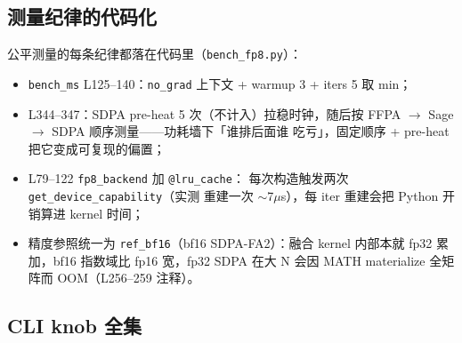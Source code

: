 \subsection{测量纪律的代码化}

公平测量的每条纪律都落在代码里（\texttt{bench\_fp8.py}）：
\begin{itemize}[itemsep=0pt,topsep=2pt]
  \item \texttt{bench\_ms} L125--140：\texttt{no\_grad} 上下文 +
        warmup 3 + iters 5 取 min；
  \item L344--347：SDPA pre-heat 5 次（不计入）拉稳时钟，随后按
        FFPA $\to$ Sage $\to$ SDPA 顺序测量——功耗墙下「谁排后面谁
        吃亏」，固定顺序 + pre-heat 把它变成可复现的偏置；
  \item L79--122 \texttt{fp8\_backend} 加 \texttt{@lru\_cache}：
        每次构造触发两次 \texttt{get\_device\_capability}（实测
        重建一次 $\sim$7$\mu$s），每 iter 重建会把 Python 开销算进
        kernel 时间；
  \item 精度参照统一为 \texttt{ref\_bf16}（bf16 SDPA-FA2）：融合
        kernel 内部本就 fp32 累加，bf16 指数域比 fp16 宽，fp32 SDPA
        在大 N 会因 MATH materialize 全矩阵而 OOM（L256--259 注释）。
\end{itemize}

\subsection{CLI knob 全集}

